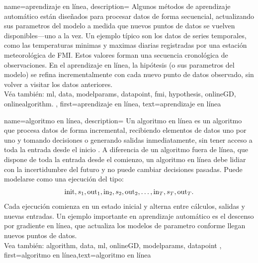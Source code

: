 {name={aprendizaje en línea},
	description={
		Algunos métodos de aprendizaje automático  están diseñados para procesar 
		datos de forma secuencial, actualizando sus parametros del modelo a medida que nuevos 
		puntos de datos se vuelven disponibles—uno a la vez. Un ejemplo típico son los datos de 
		series temporales, como las temperaturas minimas y maximas diarias registradas 
		por una estación meteorológica de FMI. Estos valores forman una secuencia cronológica 
		de observaciones. En el aprendizaje en línea, la hipótesis (o sus parametros del modelo) 
		se refina incrementalmente con cada nuevo punto de datos observado, sin volver a visitar 
		los datos anteriores.\\ 
		Véa también: \gls{ml}, \gls{data}, \gls{modelparams}, \gls{datapoint}, \gls{fmi}, \gls{hypothesis}, \gls{onlineGD}, \gls{onlinealgorithm}.
	},
	first={aprendizaje en línea},
	text={aprendizaje en línea}
}

{name=algoritmo en línea,
	description={
		Un algoritmo en línea es un algoritmo que procesa datos de forma incremental,
		recibiendo elementos de datos uno por uno y tomando decisiones o generando salidas inmediatamente, sin tener acceso a toda la entrada desde el inicio \cite{HazanOCO,PredictionLearningGames}.
		A diferencia de un algoritmo fuera de línea, que dispone de toda la entrada desde el comienzo, un algoritmo en línea debe lidiar con la incertidumbre del futuro y no puede cambiar decisiones pasadas.
		Puede modelarse como una ejecución del tipo:
		$${\rm init},s_1,{\rm out}_{1},{\rm in}_{2},s_2,{\rm out}_{2},\ldots,{\rm in}_{T},s_T,{\rm out}_{T}.$$
		Cada ejecución comienza en un estado inicial y alterna entre cálculos, salidas y nuevas entradas.
		Un ejemplo importante en aprendizaje automático es el descenso por gradiente en línea, que actualiza los modelos de parametro conforme llegan nuevos puntos de datos.
		\\
		Vea también: \gls{algorithm}, \gls{data}, \gls{ml}, \gls{onlineGD}, \gls{modelparams}, \gls{datapoint} },
	first={algoritmo en línea},text={algoritmo en línea}
}



